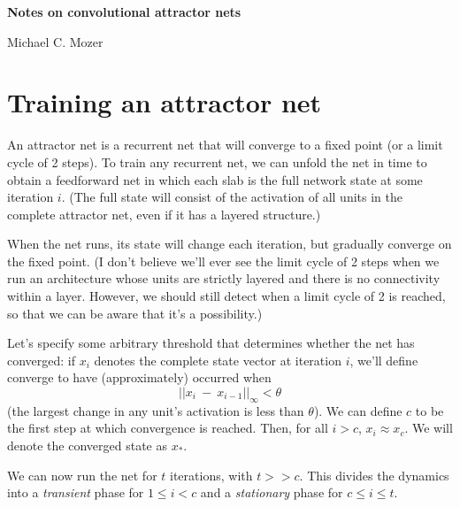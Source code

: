 \documentclass[11pt,letterpaper]{article}
\begin{document}
\begin{center}

{\Large \textbf{Notes on convolutional attractor nets}}

\vspace{1em}
Michael C. Mozer

\end{center}



\section{Training an attractor net}

An attractor net is a recurrent net that will converge to a fixed point
(or a limit cycle of 2 steps). To train any recurrent net, we can unfold
the net in time to obtain a feedforward net in which each slab is
the full network state at some iteration $i$.  (The full state will
consist of the activation of all units in the complete attractor net, even
if it has a layered structure.)

When the net runs, its state will change each iteration, but gradually 
converge on the fixed point. (I don't believe we'll ever see the limit
cycle of 2 steps when we run an architecture whose units are strictly
layered and there is no connectivity within a layer. However, we should
still detect when a limit cycle of 2 is reached, so that we can be
aware that it's a possibility.)

Let's specify some arbitrary threshold that determines whether the net has 
converged: if $x_i$ denotes the complete state vector at iteration $i$, 
we'll define converge to have (approximately) occurred 
when 
\[
||x_i~-~x_{i-1}||_\infty<\theta
\] 
(the largest 
change in any unit's activation is less than $\theta$). We can define
$c$ to be the first step at which convergence is reached.  Then, for all
$i > c$, $x_i \approx x_c$. We will denote the converged state as $x_*$.

We can now run the net for $t$ iterations, with $t >> c$.  This divides the
dynamics into a \emph{transient} phase for $1\le i<c$ and a \emph{stationary}
phase for $c \le i \le t$.
\end{document}
